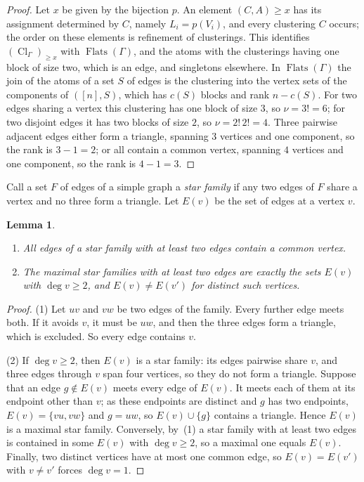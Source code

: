 \documentclass[11pt,a4paper]{article}
\numberwithin{equation}{section}
\theoremstyle{plain}
\newtheorem{lemma}[theorem]{Lemma}
\theoremstyle{definition}
\theoremstyle{remark}
\DeclareMathOperator{\Flats}{Flats}
\DeclareMathOperator{\Cl}{Cl}
\begin{document}
\begin{proof}
Let $x$ be given by the bijection $p$. An element $(C,A)\geqslant x$ has its assignment determined by $C$, namely $L_i=p(V_i)$, and every clustering $C$ occurs; the order on these elements is refinement of clusterings. This identifies $(\Cl_\Gamma)_{\geqslant x}$ with $\Flats(\Gamma)$, and the atoms with the clusterings having one block of size two, which is an edge, and singletons elsewhere. In $\Flats(\Gamma)$ the join of the atoms of a set $S$ of edges is the clustering into the vertex sets of the components of $([n],S)$, which has $c(S)$ blocks and rank $n-c(S)$. For two edges sharing a vertex this clustering has one block of size $3$, so $\nu=3!=6$; for two disjoint edges it has two blocks of size $2$, so $\nu=2!\,2!=4$. Three pairwise adjacent edges either form a triangle, spanning $3$ vertices and one component, so the rank is $3-1=2$; or all contain a common vertex, spanning $4$ vertices and one component, so the rank is $4-1=3$.
\end{proof}

Call a set $F$ of edges of a simple graph a \emph{star family} if any two edges of $F$ share a vertex and no three form a triangle. Let $E(v)$ be the set of edges at a vertex $v$.

\begin{lemma}\label{lem:stars}
\begin{enumerate}[nosep,label=(\arabic*)]
\item All edges of a star family with at least two edges contain a common vertex.
\item The maximal star families with at least two edges are exactly the sets $E(v)$ with $\deg v\geqslant2$, and $E(v)\neq E(v')$ for distinct such vertices.
\end{enumerate}
\end{lemma}

\begin{proof}
(1) Let $uv$ and $vw$ be two edges of the family. Every further edge meets both. If it avoids $v$, it must be $uw$, and then the three edges form a triangle, which is excluded. So every edge contains $v$.

(2) If $\deg v\geqslant2$, then $E(v)$ is a star family: its edges pairwise share $v$, and three edges through $v$ span four vertices, so they do not form a triangle. Suppose that an edge $g\notin E(v)$ meets every edge of $E(v)$. It meets each of them at its endpoint other than $v$; as these endpoints are distinct and $g$ has two endpoints, $E(v)=\{vu,vw\}$ and $g=uw$, so $E(v)\cup\{g\}$ contains a triangle. Hence $E(v)$ is a maximal star family. Conversely, by~(1) a star family with at least two edges is contained in some $E(v)$ with $\deg v\geqslant2$, so a maximal one equals $E(v)$. Finally, two distinct vertices have at most one common edge, so $E(v)=E(v')$ with $v\neq v'$ forces $\deg v=1$.
\end{proof}
\end{document}
